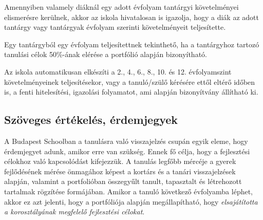 Amennyiben valamely diáknál egy adott évfolyam tantárgyi követelményei
elismerésre kerülnek, akkor az iskola hivatalosan is igazolja, hogy a diák az
adott tantárgy vagy tantárgyak évfolyam szerinti követelményeit teljesítette.

Egy tantárgyból egy évfolyam teljesítettnek tekinthető, ha a tantárgyhoz
tartozó tanulási célok 50\%-ának elérése a portfólió alapján bizonyítható.

Az iskola automatikusan elkészíti a 2., 4., 6., 8., 10. és 12. évfolyamszint
követelményeinek teljesítésekor, vagy a tanuló/szülő kérésére ettől eltérő
időben is, a fenti hitelesítési, igazolási folyamatot, ami alapján bizonyítvány
állítható ki.
\subsection{Szöveges értékelés, érdemjegyek}

A Budapest Schoolban a tanulásra való visszajelzés csupán egyik eleme, hogy
érdemjegyet adunk, amikor erre van szükség. Ennek fő célja, hogy a fejlesztési
célokhoz való kapcsolódást kifejezzük. A tanulás legfőbb mércéje a gyerek
fejlődésének mérése önmagához képest a kortárs és a tanári visszajelzések
alapján, valamint a portfolióban összegyűlt tanult, tapasztalt és létrehozott
tartalmak rögzítése formájában.  Amikor a tanuló következő évfolyamba léphet,
akkor ez azt jelenti, hogy a portfóliója alapján megállapítható, hogy
\emph{elsajátította a korosztályának megfelelő fejlesztési célokat}.
